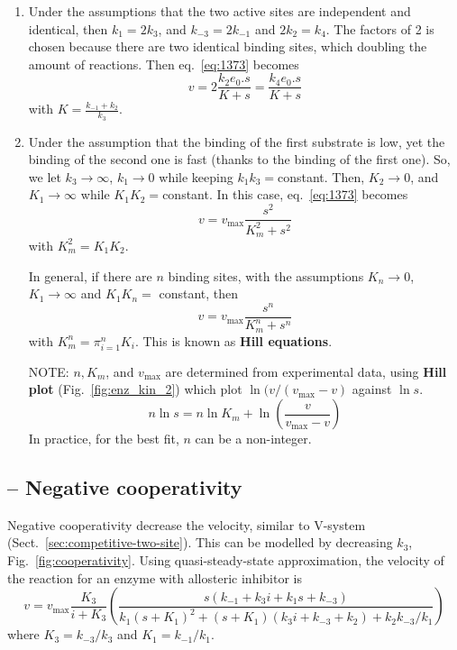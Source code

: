 \begin{enumerate}
\item Under the assumptions that the two active sites are independent
  and identical, then $k_1=2k_3$, and $k_{-3}=2k_{-1}$ and
  $2k_2=k_4$. The factors of 2 is chosen because there are two
  identical binding sites, which doubling the amount of
  reactions. Then eq.~\eqref{eq:1373} becomes
\begin{equation}
  \label{eq:1374}
  v = 2\frac{k_2e_0.s}{K+s}=\frac{k_4e_0.s}{K+s}
\end{equation}
with $K=\frac{k_{-1}+k_2}{k_3}$.


\item Under the assumption that the binding of the first substrate is
  low, yet the binding of the second one is fast (thanks to the
  binding of the first one). So, we let $k_3\rightarrow\infty$,
  $k_1\rightarrow 0$ while keeping $k_1k_3=$constant. Then,
  $K_2\rightarrow 0$, and $K_1\rightarrow \infty$ while
  $K_1K_2=$constant. In this case, eq.~\eqref{eq:1373} becomes
  \begin{equation}
    \label{eq:1375}
    v = v_\max \frac{s^2}{K_m^2+s^2}
  \end{equation}
with $K_m^2=K_1K_2$.


In general, if there are $n$ binding sites, with the assumptions
$K_n\rightarrow 0$, $K_1\rightarrow\infty$ and $K_1K_n=$ constant,
then 
\begin{equation}
  \label{eq:1376}
  v = v_\max \frac{s^n}{K_m^n+s^n}
\end{equation}
with $K_m^n=\pi^n_{i=1}K_i$. This is known as {\bf Hill equations}.

NOTE: $n, K_m$, and $v_\max$ are determined from experimental data,
using {\bf Hill plot} (Fig.~\ref{fig:enz_kin_2}) which plot
$\ln(v/(v_\max-v)$ against $\ln s$.
\begin{equation}
  \label{eq:1377}
  n\ln s = n\ln K_m + \ln\left(\frac{v}{v_\max-v}\right)
\end{equation}
In practice, for the best fit, $n$ can be a non-integer.  

\end{enumerate}

\subsection{-- Negative cooperativity}
\label{sec:negat-coop}

Negative cooperativity decrease the velocity, similar to V-system
(Sect.~\ref{sec:competitive-two-site}). This can be modelled by
decreasing $k_3$, Fig.~\ref{fig:cooperativity}.
Using quasi-steady-state approximation, the velocity of the reaction
for an enzyme with allosteric inhibitor is
\begin{equation}
  \label{eq:1390}
  v = v_\max\frac{K_3}{i+K_3}
  \left( \frac{s(k_{-1}+k_3i+k_1s+k_{-3})}{k_1(s+K_1)^2+(s+K_1)(k_3i+k_{-3}+k_2)+k_2k_{-3}/k_1}\right)
\end{equation}
where $K_3=k_{-3}/k_3$ and $K_1=k_{-1}/k_1$.


